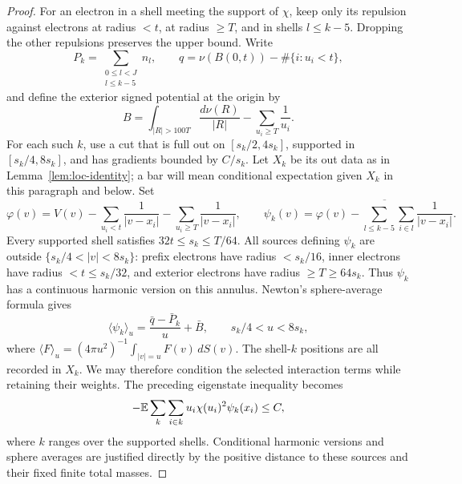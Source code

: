 \begin{proof}
For an electron in a shell meeting the support of $\chi$, keep only its
repulsion against electrons at radius $<t$, at radius $\ge T$, and in
shells $l\le k-5$.  Dropping the other repulsions preserves the upper
bound.  Write
\[
 P_k=\sum_{\substack{0\le l<J\\l\le k-5}}n_l,
 \qquad q=\nu(B(0,t))-\#\{i:u_i<t\},
\]
and define the exterior signed potential at the origin by
\[
 B=\int_{|R|>100T}\frac{d\nu(R)}{|R|}
       -\sum_{u_i\ge T}\frac1{u_i}.
\]
For each such $k$, use a cut that is full out on
$[s_k/2,4s_k]$, supported in $[s_k/4,8s_k]$, and has gradients bounded
by $C/s_k$.  Let $X_k$ be its out data as in
Lemma~\ref{lem:loc-identity}; a bar will mean conditional expectation
given $X_k$ in this paragraph and below.  Set
\[
 \varphi(v)=V(v)-\sum_{u_i<t}\frac1{|v-x_i|}
                   -\sum_{u_i\ge T}\frac1{|v-x_i|},
 \qquad
 \psi_k(v)=\overline{\varphi(v)
            -\sum_{l\le k-5}\sum_{i\in l}\frac1{|v-x_i|}}.
\]
Every supported shell satisfies $32t\le s_k\le T/64$.
All sources defining $\psi_k$ are outside
$\{s_k/4<|v|<8s_k\}$: prefix electrons have radius $<s_k/16$,
inner electrons have radius $<t\le s_k/32$, and exterior electrons have
radius $\ge T\ge64s_k$.  Thus $\psi_k$ has a continuous harmonic version
on this annulus.  Newton's sphere-average formula gives
\begin{equation}\label{m:eq:void-sphere-mean}
 \langle\psi_k\rangle_u
   =\frac{\bar q-\bar P_k}{u}+\bar B,
 \qquad s_k/4<u<8s_k,
\end{equation}
where $\langle F\rangle_u=(4\pi u^2)^{-1}\int_{|v|=u}F(v)\,dS(v)$.
The shell-$k$ positions are all recorded in $X_k$.  We may therefore
condition the selected interaction terms while retaining their weights.
The preceding eigenstate inequality becomes
\begin{equation}\label{m:eq:void-weighted-field}
 -\mathbb E\sum_k\sum_{i\in k}u_i\chi(u_i)^2\psi_k(x_i)\le C,
\end{equation}
where $k$ ranges over the supported shells.  Conditional harmonic
versions and sphere averages are justified directly by the positive
distance to these sources and their fixed finite total masses.


\end{proof}
